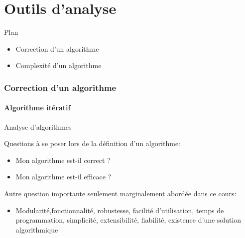 
\part{Outils d'analyse}

\begin{frame}{Plan}

\begin{itemize}
\item Correction d'un algorithme
\item Complexité d'un algorithme
\end{itemize}

\end{frame}

\section{Correction d'un algorithme}

\subsection{Algorithme itératif}

\begin{frame}{Analyse d'algorithmes}

Questions à se poser lors de la définition d'un algorithme:
\begin{itemize}
\item Mon algorithme est-il correct ?
\item Mon algorithme est-il efficace ? %
\end{itemize}

\bigskip

Autre question importante seulement marginalement abordée dans ce cours:
\begin{itemize}
\item Modularité,fonctionnalité, robustesse, facilité d'utilisation, temps
  de programmation, simplicité, extensibilité, fiabilité,
  existence d'une solution algorithmique
\end{itemize}

\end{frame}

